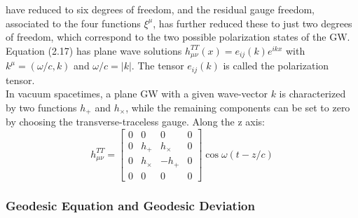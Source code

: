 \documentclass[binding=0.6cm, LaM]{sapthesis}
\begin{document}
	have reduced to six degrees of freedom, and the residual gauge freedom,
	associated to the four functions $\xi^{\mu}$, has further reduced these to just two degrees of freedom, 
	which correspond to the two possible polarization states of the GW. 
	Equation (2.17) has plane wave solutions $h_{\mu\nu}^{TT}(x)=e_{ij}(k)e^{ikx}$ with 
	$k^{\mu}=(\omega/c,k)$ and $\omega/c=|k|$. The tensor $e_{ij}(k)$ is called the polarization tensor. \\
	In vacuum spacetimes, a plane GW with a given wave-vector $k$ is characterized 
	by two functions $h_+$ and $h_{\times}$, while the remaining components can be set to zero by
	choosing the transverse-traceless gauge. 
	Along the z axis:
		\begin{equation} 
		h_{\mu\nu}^{TT} = 
		\begin{bmatrix}
		0 & 0 & 0 & 0 \\
		0 & h_{+} & h_{\times} & 0 \\
		0 & h_{\times} & -h_{+} & 0 \\
		0 & 0 & 0 & 0 
		\end{bmatrix}\cos{\omega(t-z/c)}
		\end{equation}

\subsubsection{Geodesic Equation and Geodesic Deviation}
\end{document}
